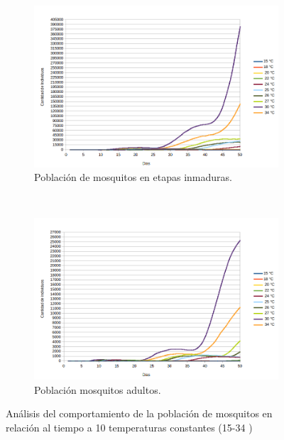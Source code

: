 \begin{figure}[!t]
    \centering
    \begin{subfigure}[b]{0.45\textwidth}
        \includegraphics[width=\textwidth]{./graphics/evolucion-poblacion-all.png}
        \caption{ Población de mosquitos en etapas inmaduras.}
    \end{subfigure}
    ~~~~
    \begin{subfigure}[b]{0.45\textwidth}
        \includegraphics[width=\textwidth]{./graphics/evolucion-poblacion-adultos.png}
        \caption{ Población mosquitos adultos.}
    \end{subfigure}

\caption{\label{fig:poblacion-all}Análisis del comportamiento de la población de mosquitos en relación al tiempo a 10 temperaturas constantes (15-34 \textcelsius)}
\end{figure}

